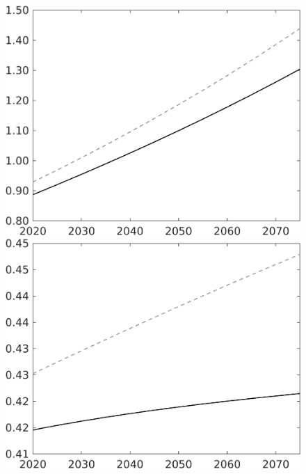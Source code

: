 \documentclass[12pt]{article}
\begin{document}
\begin{figure}[h!!]
\begin{minipage}[]{0.32\textwidth}
	\end{minipage}
	\begin{minipage}[]{0.32\textwidth}
		\includegraphics[width=1\textwidth]{../../codding_model/own_basedOnFried/optimalPol_010922_revision/figures/all_13Sept22/LevTaufNoTauf_TaulCalib_regime0_E_spillover0_nsk1_xgr0_knspil1_sep1_LFlimit0_emsbase0_countec0_GovRev0_etaa0.79_lgd0.png}
	\end{minipage}	
	\begin{minipage}[]{0.32\textwidth}
		\includegraphics[width=1\textwidth]{../../codding_model/own_basedOnFried/optimalPol_010922_revision/figures/all_13Sept22/LevTaufNoTauf_TaulCalib_regime0_EY_spillover0_nsk1_xgr0_knspil1_sep1_LFlimit0_emsbase0_countec0_GovRev0_etaa0.79_lgd0.png}

\end{minipage}
\end{figure}
\end{document}
